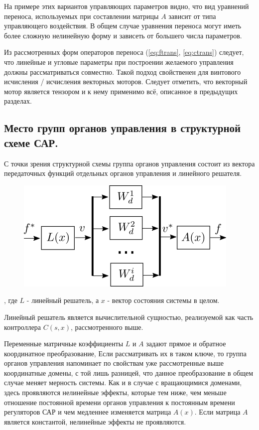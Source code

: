 \documentclass[a4paper]{article}
\begin{document}
На примере этих вариантов управляющих параметров видно, что вид уравнений переноса, используемых при составлении матрицы $A$ зависит от типа управляющего воздействия. В общем случае уравнения переноса могут иметь более сложную нелинейную форму и зависеть от большего числа параметров. 

Из рассмотренных форм операторов переноса (\ref{eq:ftrans}, \ref{eq:ctrans}) следует, что линейные и угловые параметры при построении желаемого управления должны рассматриваться совместно. Такой подход свойственен для винтового исчисления / исчисления векторных моторов. Следует отметить, что векторный мотор является тензором и к нему применимо всё, описанное в предыдущих разделах.  

\subsection{Место групп органов управления в структурной схеме САР.}
С точки зрения структурной схемы группа органов управления состоит из вектора передаточных функций отдельных органов управления и линейного решателя.

{
\begin{figure}[H]
\centering
\includegraphics{./src/slau.png}
\end{figure}
}

, где $L$ - линейный решатель, а $x$ - вектор состояния системы в целом. 

Линейный решатель является вычислительной сущностью, реализуемой как часть контроллера $C(s,x)$, рассмотренного выше.

Переменные матричные коэффициенты $L$ и $A$ задают прямое и обратное координатное преобразование, Если рассматривать их в таком ключе, то группа органов управления напоминает по свойствам уже рассмотренные выше координатные домены, с той лишь разницей, что данное преобразование в общем случае меняет мерность системы. Как и в случае с вращающимися доменами, здесь проявляются нелинейные эффекты, которые тем ниже, чем меньше отношение постоянной времени органов управления к постоянным времени регуляторов САР и чем медленнее изменяется матрица $A(x)$. Если матрица $A$ является константой, нелинейные эффекты не проявляются. 
\end{document}
